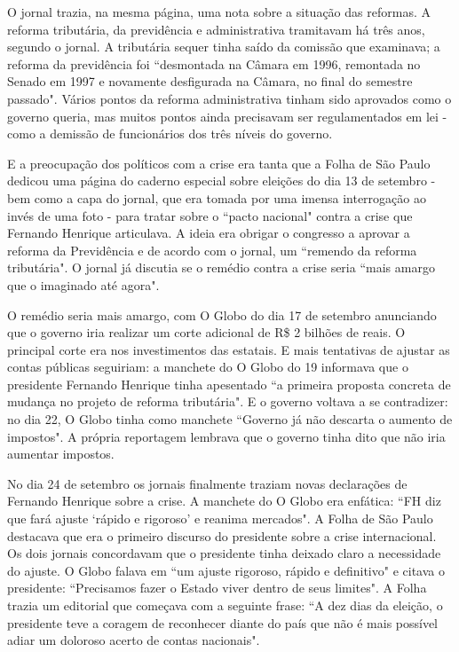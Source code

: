 \documentclass{article}
\begin{document}
O jornal trazia, na mesma página, uma nota sobre a situação das reformas. A reforma tributária, da previdência e administrativa tramitavam há três anos, segundo o jornal. A tributária sequer tinha saído da comissão que examinava; a reforma da previdência foi ``desmontada na Câmara em 1996, remontada no Senado em 1997 e novamente desfigurada na Câmara, no final do semestre passado". Vários pontos da reforma administrativa tinham sido aprovados como o governo queria, mas muitos pontos ainda precisavam ser regulamentados em lei - como a demissão de funcionários dos três níveis do governo.

E a preocupação dos políticos com a crise era tanta que a Folha de São Paulo dedicou uma página do caderno especial sobre eleições do dia 13 de setembro - bem como a capa do jornal, que era tomada por uma imensa interrogação ao invés de uma foto - para tratar sobre o ``pacto nacional" contra a crise que Fernando Henrique articulava. A ideia era obrigar o congresso a aprovar a reforma da Previdência e  de acordo com o jornal, um ``remendo da reforma tributária". O jornal já discutia se o remédio contra a crise seria ``mais amargo que o imaginado até agora".


O remédio seria mais amargo, com O Globo do dia 17 de setembro anunciando que o governo iria realizar um corte adicional de R\$ 2 bilhões de reais. O principal corte era nos investimentos das estatais. E mais tentativas de ajustar as contas públicas seguiriam: a manchete do O Globo do 19 informava que o presidente Fernando Henrique tinha apesentado ``a primeira proposta concreta de mudança no projeto de reforma tributária". E o governo voltava a se contradizer: no dia 22, O Globo tinha como manchete ``Governo já não descarta o aumento de impostos". A própria reportagem lembrava que o governo tinha dito que não iria aumentar impostos.

No dia 24 de setembro os jornais finalmente traziam novas declarações de Fernando Henrique sobre a crise. A manchete do O Globo era enfática: ``FH diz que fará ajuste `rápido e rigoroso' e reanima mercados". A Folha de São Paulo destacava que era o primeiro discurso do presidente sobre a crise internacional. Os dois jornais concordavam que o presidente tinha deixado claro a necessidade do ajuste. O Globo falava em ``um ajuste rigoroso, rápido e definitivo" e citava o presidente: ``Precisamos fazer o Estado viver dentro de seus limites". A Folha trazia um editorial que começava com a seguinte frase: ``A dez dias da eleição, o presidente teve a coragem de reconhecer diante do país que não é mais possível adiar um doloroso acerto de contas nacionais".         
\end{document}
